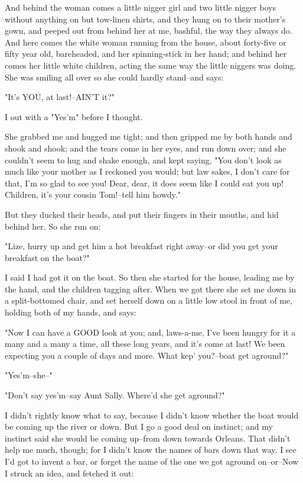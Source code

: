 And behind the woman comes a little nigger girl and two little nigger
boys without anything on but tow-linen shirts, and they hung on to their
mother's gown, and peeped out from behind her at me, bashful, the way
they always do.  And here comes the white woman running from the house,
about forty-five or fifty year old, bareheaded, and her spinning-stick in
her hand; and behind her comes her little white children, acting the same
way the little niggers was doing.  She was smiling all over so she could
hardly stand--and says:

"It's YOU, at last!--AIN'T it?"

I out with a "Yes'm" before I thought.

She grabbed me and hugged me tight; and then gripped me by both hands and
shook and shook; and the tears come in her eyes, and run down over; and
she couldn't seem to hug and shake enough, and kept saying, "You don't
look as much like your mother as I reckoned you would; but law sakes, I
don't care for that, I'm so glad to see you!  Dear, dear, it does seem
like I could eat you up!  Children, it's your cousin Tom!--tell him
howdy."

But they ducked their heads, and put their fingers in their mouths, and
hid behind her.  So she run on:

"Lize, hurry up and get him a hot breakfast right away--or did you get
your breakfast on the boat?"

I said I had got it on the boat.  So then she started for the house,
leading me by the hand, and the children tagging after.  When we got
there she set me down in a split-bottomed chair, and set herself down on
a little low stool in front of me, holding both of my hands, and says:

"Now I can have a GOOD look at you; and, laws-a-me, I've been hungry for
it a many and a many a time, all these long years, and it's come at last!
We been expecting you a couple of days and more.  What kep' you?--boat
get aground?"

"Yes'm--she--"

"Don't say yes'm--say Aunt Sally.  Where'd she get aground?"

I didn't rightly know what to say, because I didn't know whether the boat
would be coming up the river or down.  But I go a good deal on instinct;
and my instinct said she would be coming up--from down towards Orleans.
That didn't help me much, though; for I didn't know the names of bars
down that way.  I see I'd got to invent a bar, or forget the name of the
one we got aground on--or--Now I struck an idea, and fetched it out:

